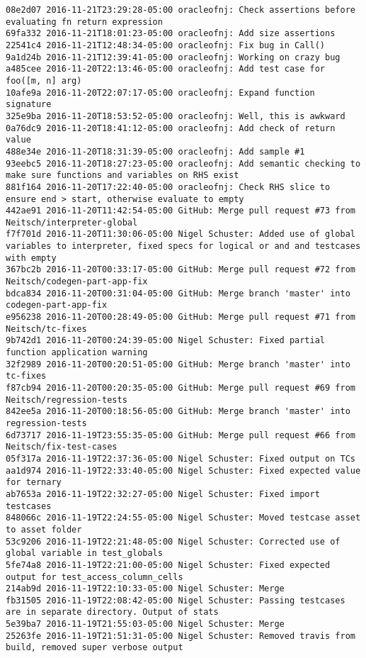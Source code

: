 \begin{lstlisting}
08e2d07 2016-11-21T23:29:28-05:00 oracleofnj: Check assertions before evaluating fn return expression
69fa332 2016-11-21T18:01:23-05:00 oracleofnj: Add size assertions
22541c4 2016-11-21T12:48:34-05:00 oracleofnj: Fix bug in Call()
9a1d24b 2016-11-21T12:39:41-05:00 oracleofnj: Working on crazy bug
a485cee 2016-11-20T22:13:46-05:00 oracleofnj: Add test case for foo([m, n] arg)
10afe9a 2016-11-20T22:07:17-05:00 oracleofnj: Expand function signature
325e9ba 2016-11-20T18:53:52-05:00 oracleofnj: Well, this is awkward
0a76dc9 2016-11-20T18:41:12-05:00 oracleofnj: Add check of return value
488e34e 2016-11-20T18:31:39-05:00 oracleofnj: Add sample #1
93eebc5 2016-11-20T18:27:23-05:00 oracleofnj: Add semantic checking to make sure functions and variables on RHS exist
881f164 2016-11-20T17:22:40-05:00 oracleofnj: Check RHS slice to ensure end > start, otherwise evaluate to empty
442ae91 2016-11-20T11:42:54-05:00 GitHub: Merge pull request #73 from Neitsch/interpreter-global
f7f701d 2016-11-20T11:30:06-05:00 Nigel Schuster: Added use of global variables to interpreter, fixed specs for logical or and and testcases with empty
367bc2b 2016-11-20T00:33:17-05:00 GitHub: Merge pull request #72 from Neitsch/codegen-part-app-fix
bdca834 2016-11-20T00:31:04-05:00 GitHub: Merge branch 'master' into codegen-part-app-fix
e956238 2016-11-20T00:28:49-05:00 GitHub: Merge pull request #71 from Neitsch/tc-fixes
9b742d1 2016-11-20T00:24:39-05:00 Nigel Schuster: Fixed partial function application warning
32f2989 2016-11-20T00:20:51-05:00 GitHub: Merge branch 'master' into tc-fixes
f87cb94 2016-11-20T00:20:35-05:00 GitHub: Merge pull request #69 from Neitsch/regression-tests
842ee5a 2016-11-20T00:18:56-05:00 GitHub: Merge branch 'master' into regression-tests
6d73717 2016-11-19T23:55:35-05:00 GitHub: Merge pull request #66 from Neitsch/fix-test-cases
05f317a 2016-11-19T22:37:36-05:00 Nigel Schuster: Fixed output on TCs
aa1d974 2016-11-19T22:33:40-05:00 Nigel Schuster: Fixed expected value for ternary
ab7653a 2016-11-19T22:32:27-05:00 Nigel Schuster: Fixed import testcases
848066c 2016-11-19T22:24:55-05:00 Nigel Schuster: Moved testcase asset to asset folder
53c9206 2016-11-19T22:21:48-05:00 Nigel Schuster: Corrected use of global variable in test_globals
5fe74a8 2016-11-19T22:21:00-05:00 Nigel Schuster: Fixed expected output for test_access_column_cells
214ab9d 2016-11-19T22:10:33-05:00 Nigel Schuster: Merge
fb31505 2016-11-19T22:08:42-05:00 Nigel Schuster: Passing testcases are in separate directory. Output of stats
5e39ba7 2016-11-19T21:55:03-05:00 Nigel Schuster: Merge
25263fe 2016-11-19T21:51:31-05:00 Nigel Schuster: Removed travis from build, removed super verbose output

\end{lstlisting}
